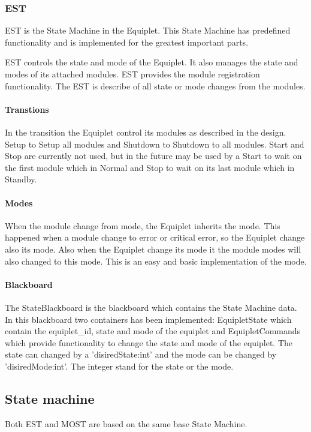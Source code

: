 \subsubsection{EST}
EST is the State Machine in the Equiplet. 
This State Machine has predefined functionality and is implemented for the greatest important parts.

EST controls the state and mode of the Equiplet.
It also manages the state and modes of its attached modules.
EST provides the module registration functionality.
The EST is describe of all state or mode changes from the modules.

\paragraph{Transtions}In the transition the Equiplet control its modules as described in the design. Setup to Setup all modules and Shutdown to Shutdown to all modules. Start and Stop are currently not used, but in the future may be used by a Start to wait on the first module which in Normal and Stop to wait on its last module which in Standby.

\paragraph{Modes}When the module change from mode, the Equiplet inherits the mode. This happened when a module change to error or critical error, so the Equiplet change also its mode. Also when the Equiplet change its mode it the module modes will also changed to this mode. This is an easy and basic implementation of the mode.

\paragraph{Blackboard}The StateBlackboard is the blackboard which contains the State Machine data. In this blackboard two containers has been implemented: EquipletState which contain the equiplet\_id, state and mode of the equiplet and EquipletCommands which provide functionality to change the state and mode of the equiplet. The state can changed by a 'disiredState:int' and the mode can be changed by 'disiredMode:int'. The integer stand for the state or the mode.

\subsection{State machine}
Both EST and MOST are based on the same base State Machine. 

